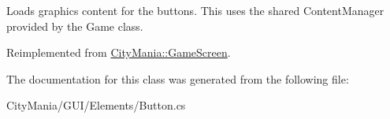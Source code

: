 Loads graphics content for the buttons. This uses the shared ContentManager provided by the Game class. 

Reimplemented from \hyperlink{classCityMania_1_1GameScreen_a4dc3798784fff49b20280903d796c94c}{CityMania::GameScreen}.

The documentation for this class was generated from the following file:\begin{DoxyCompactItemize}
\item 
CityMania/GUI/Elements/Button.cs\end{DoxyCompactItemize}
